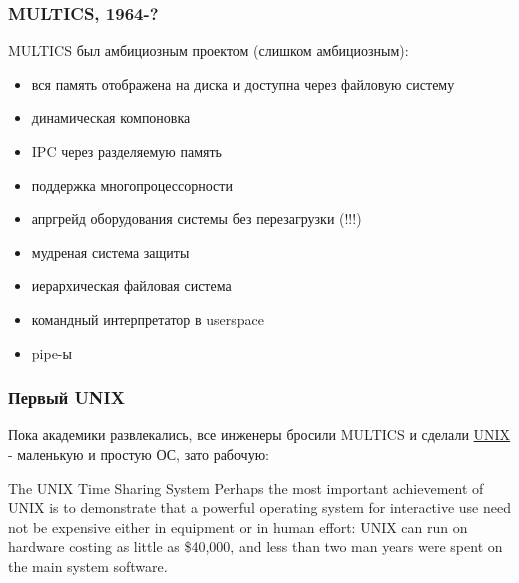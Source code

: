 \begin{frame}
\frametitle{MULTICS, 1964-?}

MULTICS был амбициозным проектом (слишком амбициозным):
\begin{itemize}
  \item вся память отображена на диска и доступна через файловую систему
  \item динамическая компоновка
  \item IPC через разделяемую память
  \item поддержка многопроцессорности
  \item апргрейд оборудования системы без перезагрузки (!!!)
  \item мудреная система защиты
  \item иерархическая файловая система
  \item командный интерпретатор в userspace
  \item pipe-ы
\end{itemize}
\end{frame}

\begin{frame}
\frametitle{Первый UNIX}

Пока академики развлекались, все инженеры бросили MULTICS и сделали
\href{http://www.cs.berkeley.edu/~brewer/cs262/unix.pdf}{UNIX} - маленькую и
простую ОС, зато рабочую:

\begin{block}{The UNIX Time Sharing System}
Perhaps the most important achievement of UNIX is to demonstrate that a
powerful operating system for interactive use need not be expensive either in
equipment or in human effort: UNIX can run on hardware costing as little as
\$40,000, and less than two man years were spent on the main system software.
\end{block}
\end{frame}
